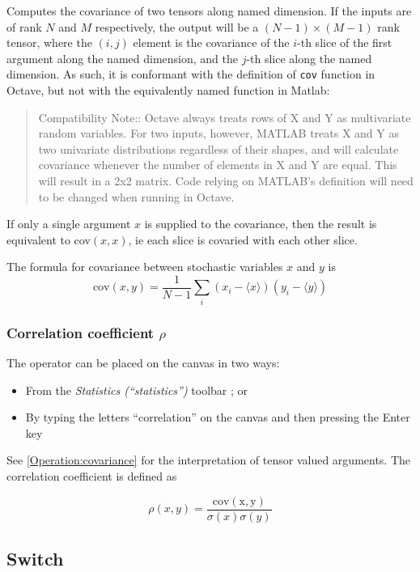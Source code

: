 Computes the covariance of two tensors along named dimension. If the
inputs are of rank $N$ and $M$ respectively, the output will be
a $(N-1)\times(M-1)$ rank tensor, where the $(i,j)$ element is the
covariance of the $i$-th slice of the first argument along the named
dimension, and the $j$-th slice along the named dimension. As such,
it is conformant with the definition of \texttt{cov} function in Octave,
but not with the equivalently named function in Matlab: 
\begin{quote}
Compatibility Note:: Octave always treats rows of X and Y as multivariate
random variables. For two inputs, however, MATLAB treats X and Y as
two univariate distributions regardless of their shapes, and will
calculate covariance whenever the number of elements in X and Y are
equal. This will result in a 2x2 matrix. Code relying on MATLAB's
definition will need to be changed when running in Octave. 
\end{quote}
If only a single argument $x$ is supplied to the covariance, then
the result is equivalent to cov$(x,x)$, ie each slice is covaried
with each other slice.

The formula for covariance between stochastic variables $x$ and $y$
is 
\[
\mathrm{cov}(x,y)=\frac{1}{N-1}\sum_{i}(x_{i}-\langle x\rangle)(y_{i}-\langle y\rangle)
\]

\subsubsection{Correlation coefficient $\rho$}\label{Operation:correlation}

\label{Operation:rho}


The operator can be placed on the canvas in two ways:
\begin{itemize}
\item From the \emph{Statistics (``statistics'')} toolbar ;
or 
\item By typing the letters ``correlation'' on the canvas and then pressing
the Enter key
\end{itemize}
See \ref{Operation:covariance} for the interpretation of tensor valued
arguments. The correlation coefficient is defined as

\[
\rho(x,y)=\frac{\mathrm{cov(x,y)}}{\sigma(x)\sigma(y)}
\]


\subsection{Switch}

